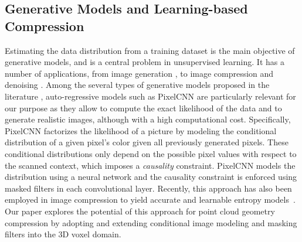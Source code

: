 \subsection{Generative Models and Learning-based Compression}
\par 
Estimating the data distribution from a training dataset is the main objective of generative models, and is a central problem in unsupervised learning.
It has a number of applications, from image generation \cite{theis2015generative,gregor2015draw, oord2016pixel,salimans2017pixelcnn++}, to image compression \cite{491334, balle2016end,mentzer2018conditional} and denoising \cite{chen2018image}. Among the several types of generative models proposed in the literature \cite{10.5555/2969033.2969125}, auto-regressive models such as PixelCNN \cite{oord2016pixel,salimans2017pixelcnn++} are particularly relevant for our purpose as they allow to compute the exact likelihood of the data and to generate realistic images, although with a high computational cost. Specifically, PixelCNN factorizes the likelihood of a picture by modeling the conditional distribution of a given pixel's color given all previously generated pixels. These conditional distributions only depend on the possible pixel values with respect to the scanned context, which imposes a \textit{causality} constraint. PixelCNN models the distribution using a neural network and the causality constraint is enforced using masked filters in each convolutional layer. Recently, this approach has also been employed in image compression to yield accurate and learnable entropy models~\cite{mentzer2018conditional}. Our paper explores the potential of this approach for point cloud geometry compression by adopting and extending conditional image modeling and masking filters into the 3D voxel domain.

